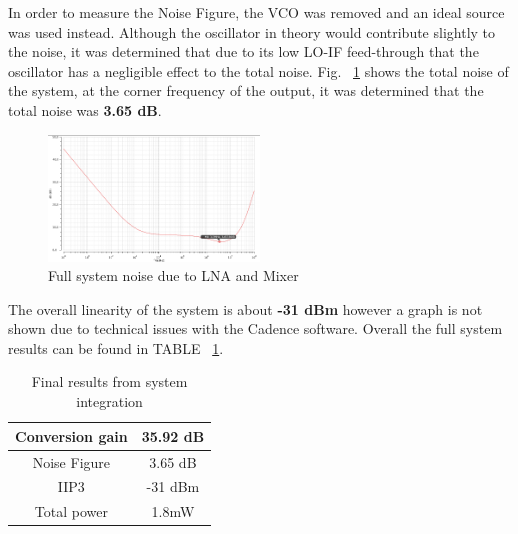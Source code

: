 In order to measure the Noise Figure, the VCO was removed and an ideal source was used instead. Although the oscillator in theory would contribute slightly to the noise, it was determined that due to its low LO-IF feed-through that the oscillator has a negligible effect to the total noise. Fig. ~\ref{fig:fullsystemnoise} shows the total noise of the system, at the corner frequency of the output, it was determined that the total noise was {\bf 3.65 dB}.

\begin{figure}[h]
   \centering
    \includegraphics[width=0.5\textwidth]{figures/FullSysNoiseFigure.png}
    \caption{Full system noise due to LNA and Mixer}
    \label{fig:fullsystemnoise}
\end{figure}

The overall linearity of the system is about {\bf -31 dBm} however a graph is not shown due to technical issues with the Cadence software. Overall the full system results can be found in TABLE ~\ref{tab:systemresults}.


\begin{table}[h]
\begin{center}
	\begin{tabular}{ |c | c | }
 		\hline                      
  		Conversion gain & 35.92 dB \\ \hline
  		Noise Figure & 3.65 dB \\ \hline
  		IIP3 & -31 dBm\\ \hline
		Total power & 1.8mW \\
  		\hline  
	\end{tabular}

\end{center}
\caption{Final results from system integration}
\label{tab:systemresults}
\end{table}
